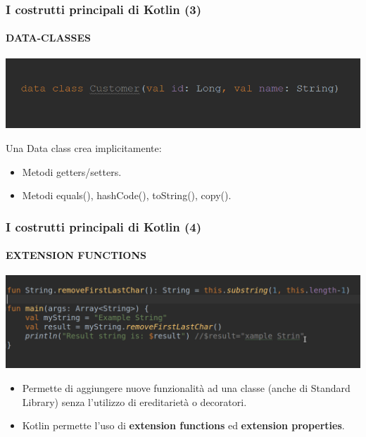     \begin{frame}
      \frametitle{I costrutti principali di Kotlin (3)}
      \framesubtitle{DATA-CLASSES}
      \begin{center}
        \includegraphics[scale=0.5]{DataClass}
      \end{center}
      Una Data class crea \alert{implicitamente}:
      \begin{itemize}
        \item Metodi getters/setters.
        \item Metodi equals(), hashCode(), toString(), copy().
      \end{itemize}
    \end{frame}

    \begin{frame}
      \frametitle{I costrutti principali di Kotlin (4)}
      \framesubtitle{EXTENSION FUNCTIONS}
      \begin{center}
        \includegraphics[scale=0.4]{ExtFun}
      \end{center}
      \begin{itemize}
        \item Permette di aggiungere nuove funzionalità ad una classe (anche di Standard Library) senza l'utilizzo di ereditarietà o decoratori.
        \item Kotlin permette l'uso di \textbf{extension functions} ed \textbf{extension properties}.
      \end{itemize}
    \end{frame}

